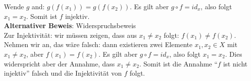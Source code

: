 \documentclass{article}
\begin{document}
Wende $g$ and: $g(f(x_1)) = g(f(x_2))$. Es gilt aber $g \circ f = id_x$, also folgt $x_1 = x_2$. Somit ist $f$ injektiv. \\

\textbf{Alternativer Beweis}: Widerspruchsbeweis \\

Zur Injektivität: wir müssen zeigen, dass aus $x_1 \ne x_2$ folgt: $f(x_1) \ne f(x_2)$. Nehmen wir an, das wäre falsch:
dann existieren zwei Elemente $x_1, x_2 \in X$ mit $x_1 \ne x_2$, aber $f(x_1) = f(x_2)$.
Es gilt aber $g \circ f = id_x$, also folgt $x_1 = x_2$. Dies widerspricht aber der Annahme, dass $x_1 \ne x_2$.
Somit ist die Annahme ``$f$ ist nicht injektiv'' falsch und die Injektivität von $f$ folgt.
\end{document}
